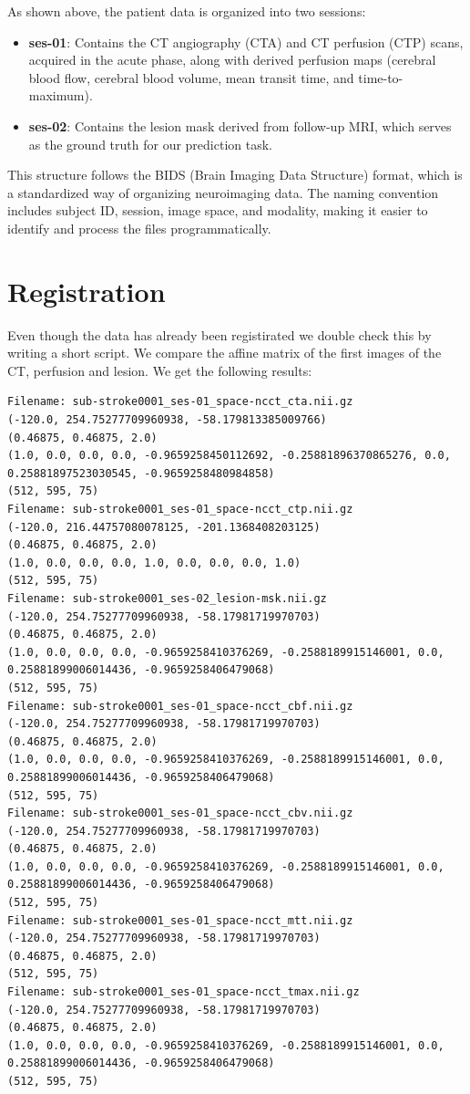 As shown above, the patient data is organized into two sessions:
\begin{itemize}
    \item \textbf{ses-01}: Contains the CT angiography (CTA) and CT perfusion (CTP) scans, acquired in the acute phase, along with derived perfusion maps (cerebral blood flow, cerebral blood volume, mean transit time, and time-to-maximum).
    \item \textbf{ses-02}: Contains the lesion mask derived from follow-up MRI, which serves as the ground truth for our prediction task.
\end{itemize}

This structure follows the BIDS (Brain Imaging Data Structure) format, which is a standardized way of organizing neuroimaging data. The naming convention includes subject ID, session, image space, and modality, making it easier to identify and process the files programmatically.

\section{Registration}
\label{sec:registration}
Even though the data has already been registirated we double check this by writing a short script. 
We compare the affine matrix of the first images of the CT, perfusion and lesion. 
We get the following results:

\begin{lstlisting}[breaklines=true, basicstyle=\ttfamily\small]
Filename: sub-stroke0001_ses-01_space-ncct_cta.nii.gz
(-120.0, 254.75277709960938, -58.179813385009766)
(0.46875, 0.46875, 2.0)
(1.0, 0.0, 0.0, 0.0, -0.9659258450112692, -0.25881896370865276, 0.0, 0.25881897523030545, -0.9659258480984858)
(512, 595, 75)
Filename: sub-stroke0001_ses-01_space-ncct_ctp.nii.gz
(-120.0, 216.44757080078125, -201.1368408203125)
(0.46875, 0.46875, 2.0)
(1.0, 0.0, 0.0, 0.0, 1.0, 0.0, 0.0, 0.0, 1.0)
(512, 595, 75)
Filename: sub-stroke0001_ses-02_lesion-msk.nii.gz
(-120.0, 254.75277709960938, -58.17981719970703)
(0.46875, 0.46875, 2.0)
(1.0, 0.0, 0.0, 0.0, -0.9659258410376269, -0.2588189915146001, 0.0, 0.25881899006014436, -0.9659258406479068)
(512, 595, 75)
Filename: sub-stroke0001_ses-01_space-ncct_cbf.nii.gz
(-120.0, 254.75277709960938, -58.17981719970703)
(0.46875, 0.46875, 2.0)
(1.0, 0.0, 0.0, 0.0, -0.9659258410376269, -0.2588189915146001, 0.0, 0.25881899006014436, -0.9659258406479068)
(512, 595, 75)
Filename: sub-stroke0001_ses-01_space-ncct_cbv.nii.gz
(-120.0, 254.75277709960938, -58.17981719970703)
(0.46875, 0.46875, 2.0)
(1.0, 0.0, 0.0, 0.0, -0.9659258410376269, -0.2588189915146001, 0.0, 0.25881899006014436, -0.9659258406479068)
(512, 595, 75)
Filename: sub-stroke0001_ses-01_space-ncct_mtt.nii.gz
(-120.0, 254.75277709960938, -58.17981719970703)
(0.46875, 0.46875, 2.0)
(512, 595, 75)
Filename: sub-stroke0001_ses-01_space-ncct_tmax.nii.gz
(-120.0, 254.75277709960938, -58.17981719970703)
(0.46875, 0.46875, 2.0)
(1.0, 0.0, 0.0, 0.0, -0.9659258410376269, -0.2588189915146001, 0.0, 0.25881899006014436, -0.9659258406479068)
(512, 595, 75)
\end{lstlisting}

